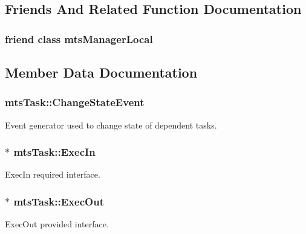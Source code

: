 \subsection{Friends And Related Function Documentation}
\hypertarget{classmts_task_a31c1c611dbb103ac58ed40d84960baa0}{}
\subsubsection[{mts\+Manager\+Local}]{\setlength{\rightskip}{0pt plus 5cm}friend class {\bf mts\+Manager\+Local}\hspace{0.3cm}{\ttfamily [friend]}}\label{classmts_task_a31c1c611dbb103ac58ed40d84960baa0}


\subsection{Member Data Documentation}
\hypertarget{classmts_task_ae7a10d8ab52bae5e6a5dc9589a7a386e}{}
\subsubsection[{Change\+State\+Event}]{ mts\+Task\+::\+Change\+State\+Event\hspace{0.3cm}{\ttfamily [protected]}}\label{classmts_task_ae7a10d8ab52bae5e6a5dc9589a7a386e}
Event generator used to change state of dependent tasks. \hypertarget{classmts_task_af77b19432b3640be7680c03cd0f78c22}{}
\subsubsection[{Exec\+In}]{$\ast$ mts\+Task\+::\+Exec\+In\hspace{0.3cm}{\ttfamily [protected]}}\label{classmts_task_af77b19432b3640be7680c03cd0f78c22}
Exec\+In required interface. \hypertarget{classmts_task_a5a65f2162a178087dc90effe7a9ab6d8}{}
\subsubsection[{Exec\+Out}]{$\ast$ mts\+Task\+::\+Exec\+Out\hspace{0.3cm}{\ttfamily [protected]}}\label{classmts_task_a5a65f2162a178087dc90effe7a9ab6d8}
Exec\+Out provided interface. \hypertarget{classmts_task_a019723804fb78a9c8a2146d921290570}{}
